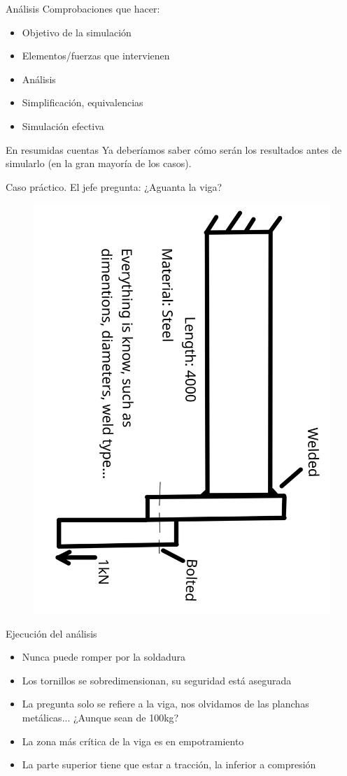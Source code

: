 \documentclass[12pt]{beamer}
\begin{document}
\begin{frame}{Análisis}
	Comprobaciones que hacer:
	\begin{itemize}[label=$\checkmark$]
		\item Objetivo de la simulación
		\item Elementos/fuerzas que intervienen
		\item Análisis
		\item Simplificación, equivalencias
		\item Simulación efectiva
	\end{itemize}
	\begin{block}{En resumidas cuentas}
		Ya deberíamos saber cómo serán los resultados antes de simularlo (en la gran mayoría de los casos).
	\end{block}
\end{frame}

\begin{frame}{Caso práctico. El jefe pregunta: ¿Aguanta la viga?}
	\begin{figure}
		\centering
		\includegraphics[width=0.7\linewidth,angle=90]{case}
		\label{fig:case}
	\end{figure}
\end{frame}

\begin{frame}{Ejecución del análisis}
	\begin{itemize}[label=$\checkmark$]
		\item Nunca puede romper por la soldadura
		\item Los tornillos se sobredimensionan, su seguridad está asegurada
		\item La pregunta solo se refiere a la viga, nos olvidamos de las planchas metálicas... ¿Aunque sean de 100kg?
		\item La zona más crítica de la viga es en empotramiento
		\item La parte superior tiene que estar a tracción, la inferior a compresión
	\end{itemize}
\end{frame}
\end{document}
